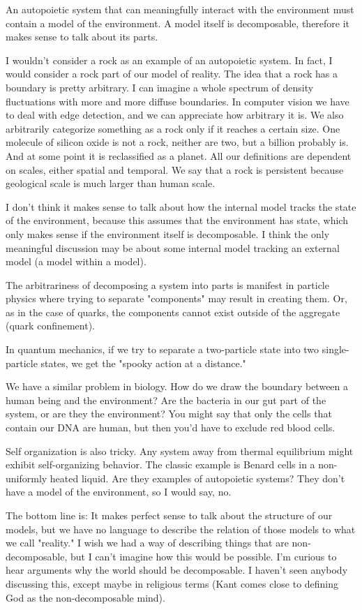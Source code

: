 \documentclass{amsart}
\begin{document}
An autopoietic system that can meaningfully interact with the environment must contain a model of the environment. A model itself is decomposable, therefore it makes sense to talk about its parts.

I wouldn't consider a rock as an example of an autopoietic system. In fact, I would consider a rock part of our model of reality. The idea that a rock has a boundary is pretty arbitrary. I can imagine a whole spectrum of density fluctuations with more and more diffuse boundaries. In computer vision we have to deal with edge detection, and we can appreciate how arbitrary it is. We also arbitrarily categorize something as a rock only if it reaches a certain size. One molecule of silicon oxide is not a rock, neither are two, but a billion probably is. And at some point it is reclassified as a planet. All our definitions are dependent on scales, either spatial and temporal. We say that a rock is persistent because geological scale is much larger than human scale.


I don't think it makes sense to talk about how the internal model tracks the state of the environment, because this assumes that the environment has state, which only makes sense if the environment itself is decomposable. I think the only meaningful discussion may be about some internal model tracking an external model (a model within a model).

The arbitrariness of decomposing a system into parts is manifest in particle physics where trying to separate "components" may result in creating them. Or, as in the case of quarks, the components cannot exist outside of the aggregate (quark confinement).

In quantum mechanics, if we try to separate a two-particle state into two single-particle states, we get the "spooky action at a distance."

We have a similar problem in biology. How do we draw the boundary between a human being and the environment? Are the bacteria in our gut part of the system, or are they the environment? You might say that only the cells that contain our DNA are human, but then you'd have to exclude red blood cells.

Self organization is also tricky. Any system away from thermal equilibrium might exhibit self-organizing behavior. The classic example is Benard cells in a non-uniformly heated liquid. Are they examples of autopoietic systems? They don't have a model of the environment, so I would say, no.

The bottom line is: It makes perfect sense to talk about the structure of our models, but we have no language to describe the relation of those models to what we call "reality." I wish we had a way of describing things that are non-decomposable, but I can't imagine how this would be possible. I'm curious to hear arguments why the world should be decomposable. I haven't seen anybody discussing this, except maybe in religious terms (Kant comes close to defining God as the non-decomposable mind).
\end{document}
